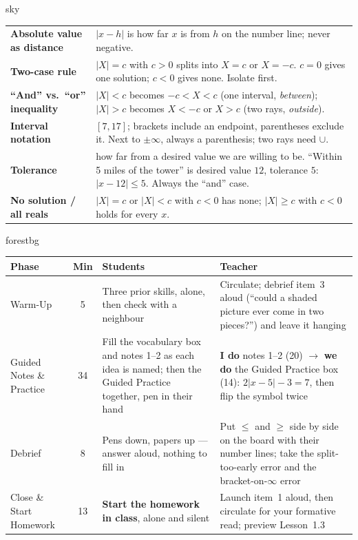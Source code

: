 \documentclass[10pt]{article}
\newcommand{\MeetingLength}{60 minutes}
\begin{document}
\boxguard
\begin{skillbox}{sky}
\renewcommand{\arraystretch}{1.3}
\begin{tabularx}{\linewidth}{@{}l X@{}}
\textbf{Absolute value as distance} & $|x-h|$ is how far $x$ is from $h$ on the number line; never negative. \\
\textbf{Two-case rule} & $|X|=c$ with $c>0$ splits into $X=c$ or $X=-c$. $c=0$ gives one solution; $c<0$ gives none. Isolate first. \\
\textbf{``And'' vs.\ ``or'' inequality} & $|X|<c$ becomes $-c<X<c$ (one interval, \emph{between}); $|X|>c$ becomes $X<-c$ or $X>c$ (two rays, \emph{outside}). \\
\textbf{Interval notation} & $[7,17]$; brackets include an endpoint, parentheses exclude it. Next to $\pm\infty$, always a parenthesis; two rays need $\cup$. \\
\textbf{Tolerance} & how far from a desired value we are willing to be. ``Within 5 miles of the tower'' is desired value $12$, tolerance $5$: $|x-12|\le5$. Always the ``and'' case. \\
\textbf{No solution / all reals} & $|X|=c$ or $|X|<c$ with $c<0$ has none; $|X|\ge c$ with $c<0$ holds for every $x$. \\
\end{tabularx}
\end{skillbox}

\boxguard[30]
\begin{skillbox}[Lesson at a Glance --- \MeetingLength]{forestbg}
\renewcommand{\arraystretch}{1.25}
\begin{tabularx}{\linewidth}{@{}l c X X@{}}
\textbf{Phase} & \textbf{Min} & \textbf{Students} & \textbf{Teacher} \\
\hline
Warm-Up & 5 & Three prior skills, alone, then check with a neighbour & Circulate; debrief item~3
  aloud (``could a shaded picture ever come in two pieces?'') and leave it hanging \\
Guided Notes \& Practice & 34 & Fill the vocabulary box and notes 1--2 as each idea is named;
  then the Guided Practice together, pen in their hand & \textbf{I do} notes 1--2 (20) $\to$
  \textbf{we do} the Guided Practice box (14): $2|x-5|-3=7$, then flip the symbol twice \\
Debrief & 8 & Pens down, papers up --- answer aloud, nothing to fill in & Put $\le$ and $\ge$
  side by side on the board with their number lines; take the split-too-early error and the
  bracket-on-$\infty$ error \\
Close \& Start Homework & 13 & \textbf{Start the homework in class}, alone and silent & Launch
  item~1 aloud, then circulate for your formative read; preview Lesson~1.3 \\
\end{tabularx}
\end{skillbox}
\end{document}
